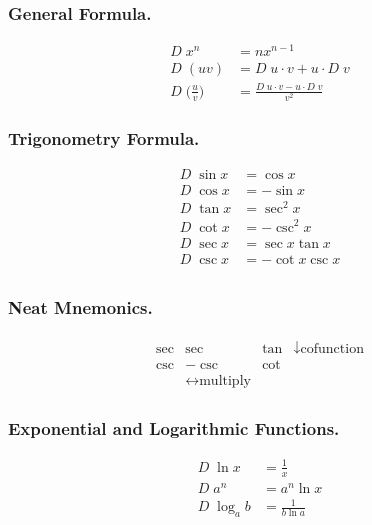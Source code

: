 \documentclass[../main.tex]{subfiles}
\begin{document}
\subsubsection*{General Formula.}
\begin{align*}
     D\; x^n&=nx^{n-1}\\
     D\; (uv)&= D\;u\cdot v+u\cdot D\;v\\
     D\;\bigg(\frac{u}{v}\bigg)&=\frac{ D\;u\cdot v-u\cdot D\;v}{v^2}
\end{align*}

\subsubsection*{Trigonometry Formula.}
\begin{align*}
     D\; \sin x&= \cos x\\
     D\; \cos x&= -\sin x\\
     D\; \tan x&= \sec^2 x\\
     D\; \cot x&= -\csc^2 x\\
     D\; \sec x&= \sec x\tan x\\
     D\; \csc x&= -\cot x\csc x\\
\end{align*}

\subsubsection*{Neat Mnemonics.}
\begin{align*}
\begin{matrix}
    \sec&\sec&\tan&\downarrow \textrm{cofunction}\\
    \csc&-\csc&\cot&\\
    &\leftrightarrow\textrm{multiply}
\end{matrix}
\end{align*}

\subsubsection*{Exponential and Logarithmic Functions.}
\begin{align*}
     D\; \ln x &= \frac{1}{x}\\
     D\; a^n&=a^n\ln x\\
     D\; \log_a b&=\frac{1}{b\ln a}
\end{align*}
\end{document}
